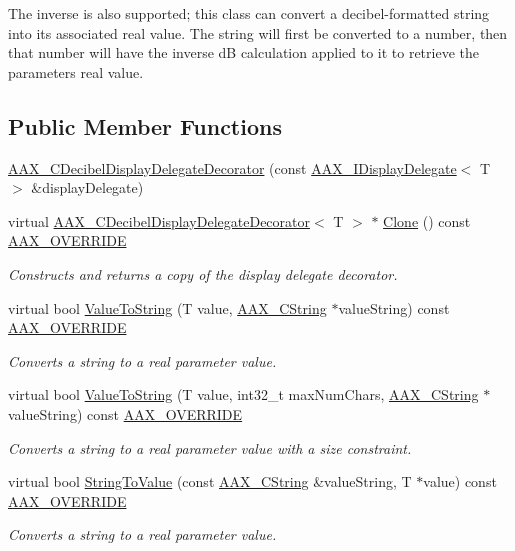 The inverse is also supported; this class can convert a decibel-\/formatted string into its associated real value. The string will first be converted to a number, then that number will have the inverse d\+B calculation applied to it to retrieve the parameter\textquotesingle{}s real value. \subsection*{Public Member Functions}
\begin{DoxyCompactItemize}
\item 
\hyperlink{a00015_aac7fbdbd0ce453aac8fa78cc4d1cef19}{A\+A\+X\+\_\+\+C\+Decibel\+Display\+Delegate\+Decorator} (const \hyperlink{a00092}{A\+A\+X\+\_\+\+I\+Display\+Delegate}$<$ T $>$ \&display\+Delegate)
\item 
virtual \hyperlink{a00015}{A\+A\+X\+\_\+\+C\+Decibel\+Display\+Delegate\+Decorator}$<$ T $>$ $\ast$ \hyperlink{a00015_a2abd5f4d5a8d6db7db73fadfe8a2aa04}{Clone} () const \hyperlink{a00149_ac2f24a5172689ae684344abdcce55463}{A\+A\+X\+\_\+\+O\+V\+E\+R\+R\+I\+D\+E}
\begin{DoxyCompactList}\small\item\em Constructs and returns a copy of the display delegate decorator. \end{DoxyCompactList}\item 
virtual bool \hyperlink{a00015_a147cb1d0b62b0a62c6e3bb98daf80027}{Value\+To\+String} (T value, \hyperlink{a00042}{A\+A\+X\+\_\+\+C\+String} $\ast$value\+String) const \hyperlink{a00149_ac2f24a5172689ae684344abdcce55463}{A\+A\+X\+\_\+\+O\+V\+E\+R\+R\+I\+D\+E}
\begin{DoxyCompactList}\small\item\em Converts a string to a real parameter value. \end{DoxyCompactList}\item 
virtual bool \hyperlink{a00015_ab301958be3d376757bf1bb88ded1c911}{Value\+To\+String} (T value, int32\+\_\+t max\+Num\+Chars, \hyperlink{a00042}{A\+A\+X\+\_\+\+C\+String} $\ast$value\+String) const \hyperlink{a00149_ac2f24a5172689ae684344abdcce55463}{A\+A\+X\+\_\+\+O\+V\+E\+R\+R\+I\+D\+E}
\begin{DoxyCompactList}\small\item\em Converts a string to a real parameter value with a size constraint. \end{DoxyCompactList}\item 
virtual bool \hyperlink{a00015_a7f4645d7e464d63ef22e93c4a99f3f09}{String\+To\+Value} (const \hyperlink{a00042}{A\+A\+X\+\_\+\+C\+String} \&value\+String, T $\ast$value) const \hyperlink{a00149_ac2f24a5172689ae684344abdcce55463}{A\+A\+X\+\_\+\+O\+V\+E\+R\+R\+I\+D\+E}
\begin{DoxyCompactList}\small\item\em Converts a string to a real parameter value. \end{DoxyCompactList}\end{DoxyCompactItemize}


